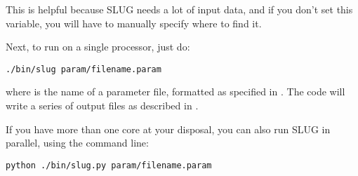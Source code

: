 \documentclass[letterpaper,10pt,english]{sphinxmanual}
\begin{document}
This is helpful because SLUG needs a lot of input data, and if you don't set this variable, you will have to manually specify where to find it.

Next, to run on a single processor, just do:

\begin{Verbatim}[commandchars=\\\{\}]
./bin/slug param/filename.param
\end{Verbatim}

where  is the name of a parameter file, formatted as specified in {\hyperref[parameters:sec-parameters]{\emph{}}}. The code will write a series of output files as described in {\hyperref[output:sec-output]{\emph{}}}.

If you have more than one core at your disposal, you can also run SLUG in parallel, using the command line:

\begin{Verbatim}[commandchars=\\\{\}]
python ./bin/slug.py param/filename.param
\end{Verbatim}
\end{document}
